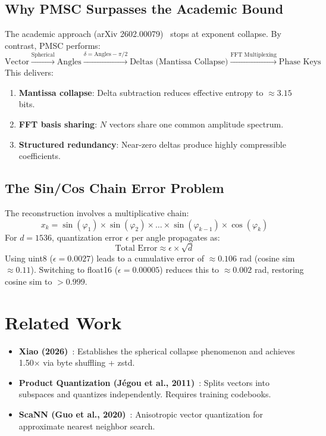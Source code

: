 \documentclass[11pt,a4paper]{article}
\begin{document}
\subsection{Why PMSC Surpasses the Academic Bound}
The academic approach (arXiv 2602.00079)~\cite{xiao2026lossless} stops at exponent collapse. By contrast, PMSC performs:
\begin{equation*}
\text{Vector} \xrightarrow{\text{Spherical}} \text{Angles} \xrightarrow{\delta = \text{Angles} - \pi/2} \text{Deltas (Mantissa Collapse)} \xrightarrow{\text{FFT Multiplexing}} \text{Phase Keys}
\end{equation*}
This delivers:
\begin{enumerate}
    \item \textbf{Mantissa collapse}: Delta subtraction reduces effective entropy to $\approx 3.15$ bits.
    \item \textbf{FFT basis sharing}: $N$ vectors share one common amplitude spectrum.
    \item \textbf{Structured redundancy}: Near-zero deltas produce highly compressible coefficients.
\end{enumerate}

\subsection{The Sin/Cos Chain Error Problem}
The reconstruction involves a multiplicative chain:
\begin{equation}
x_k = \sin(\varphi_1) \times \sin(\varphi_2) \times \dots \times \sin(\varphi_{k-1}) \times \cos(\varphi_k)
\end{equation}
For $d=1536$, quantization error $\epsilon$ per angle propagates as:
\begin{equation}
\text{Total Error} \approx \epsilon \times \sqrt{d}
\end{equation}
Using uint8 ($\epsilon = 0.0027$) leads to a cumulative error of $\approx 0.106$ rad (cosine sim $\approx 0.11$). Switching to float16 ($\epsilon = 0.00005$) reduces this to $\approx 0.002$ rad, restoring cosine sim to $>0.999$.

\section{Related Work}
\label{sec:related}
\begin{itemize}
    \item \textbf{Xiao (2026)}~\cite{xiao2026lossless}: Establishes the spherical collapse phenomenon and achieves 1.50$\times$ via byte shuffling + zstd.
    \item \textbf{Product Quantization (Jégou et al., 2011)}~\cite{jegou2011product}: Splits vectors into subspaces and quantizes independently. Requires training codebooks.
    \item \textbf{ScaNN (Guo et al., 2020)}~\cite{guo2020accelerating}: Anisotropic vector quantization for approximate nearest neighbor search.
\end{itemize}
\end{document}
